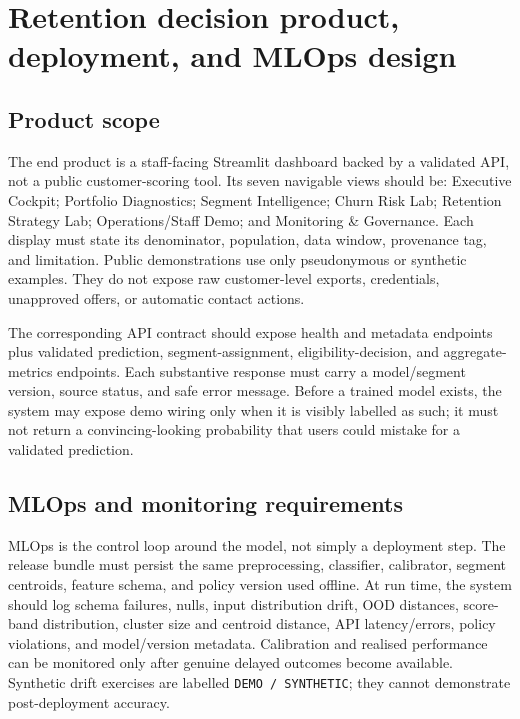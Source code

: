 \documentclass[a4paper,12pt]{article}
\begin{document}
\section{Retention decision product, deployment, and MLOps design}

\subsection{Product scope}

The end product is a staff-facing Streamlit dashboard backed by a validated API, not a public customer-scoring tool. Its seven navigable views should be: Executive Cockpit; Portfolio Diagnostics; Segment Intelligence; Churn Risk Lab; Retention Strategy Lab; Operations/Staff Demo; and Monitoring \& Governance. Each display must state its denominator, population, data window, provenance tag, and limitation. Public demonstrations use only pseudonymous or synthetic examples. They do not expose raw customer-level exports, credentials, unapproved offers, or automatic contact actions.

The corresponding API contract should expose health and metadata endpoints plus validated prediction, segment-assignment, eligibility-decision, and aggregate-metrics endpoints. Each substantive response must carry a model/segment version, source status, and safe error message. Before a trained model exists, the system may expose demo wiring only when it is visibly labelled as such; it must not return a convincing-looking probability that users could mistake for a validated prediction.

\subsection{MLOps and monitoring requirements}

MLOps is the control loop around the model, not simply a deployment step. The release bundle must persist the same preprocessing, classifier, calibrator, segment centroids, feature schema, and policy version used offline. At run time, the system should log schema failures, nulls, input distribution drift, OOD distances, score-band distribution, cluster size and centroid distance, API latency/errors, policy violations, and model/version metadata. Calibration and realised performance can be monitored only after genuine delayed outcomes become available. Synthetic drift exercises are labelled \texttt{DEMO / SYNTHETIC}; they cannot demonstrate post-deployment accuracy.
\end{document}
